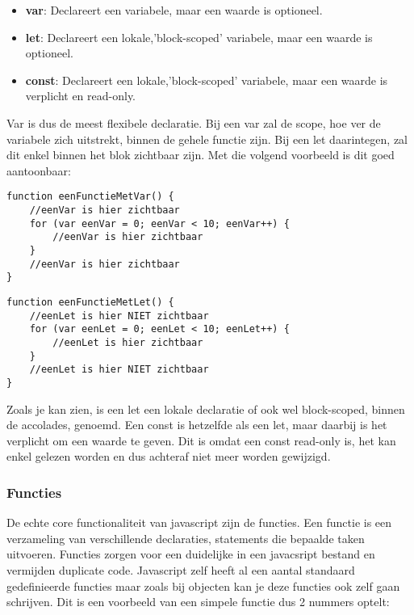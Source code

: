 \begin{itemize}
	\item \textbf{var}: Declareert een variabele, maar een waarde is optioneel.
	\item \textbf{let}: Declareert een lokale,'block-scoped' variabele, maar een waarde is optioneel.
	\item \textbf{const}: Declareert een lokale,'block-scoped' variabele, maar een waarde is verplicht en read-only.
\end{itemize}

Var is dus de meest flexibele declaratie. Bij een var zal de scope, hoe ver de variabele zich uitstrekt, binnen de gehele functie zijn. Bij een let daarintegen, zal dit enkel binnen het blok zichtbaar zijn. Met die volgend voorbeeld is dit goed aantoonbaar:

\begin{lstlisting}[frame=single, caption=Een functie met var]
function eenFunctieMetVar() {
	//eenVar is hier zichtbaar
	for (var eenVar = 0; eenVar < 10; eenVar++) {
		//eenVar is hier zichtbaar
	}
	//eenVar is hier zichtbaar
}
\end{lstlisting}

\begin{lstlisting}[frame=single, caption=Een functie met let]
function eenFunctieMetLet() {
	//eenLet is hier NIET zichtbaar
	for (var eenLet = 0; eenLet < 10; eenLet++) {
		//eenLet is hier zichtbaar
	}
	//eenLet is hier NIET zichtbaar
}
\end{lstlisting}

Zoals je kan zien, is een let een lokale declaratie of ook wel block-scoped, binnen de accolades, genoemd. Een const is hetzelfde als een let, maar daarbij is het verplicht om een waarde te geven. Dit is omdat een const read-only is, het kan enkel gelezen worden en dus achteraf niet meer worden gewijzigd.

\subsubsection{Functies}
\label{sssec:functies}
De echte core functionaliteit van javascript zijn de functies. Een functie is een verzameling van verschillende declaraties, statements die bepaalde taken uitvoeren. Functies zorgen voor een duidelijke in een javacsript bestand en vermijden duplicate code. Javascript zelf heeft al een aantal standaard gedefinieerde functies maar zoals bij objecten kan je deze functies ook zelf gaan schrijven. Dit is een voorbeeld van een simpele functie dus 2 nummers optelt:

